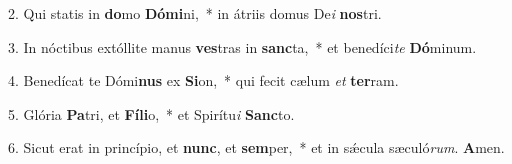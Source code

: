 2. Qui statis in \textbf{do}mo \textbf{Dó}\textbf{mi}ni,~*  in átriis domus De\textit{i} \textbf{nos}tri.\

3. In nóctibus extóllite manus \textbf{ves}tras in \textbf{sanc}ta,~*  et benedíci\textit{te} \textbf{Dó}minum.\

4. Benedícat te Dómi\textbf{nus} ex \textbf{Si}on,~*  qui fecit cælum \textit{et} \textbf{ter}ram.\

5. Glória \textbf{Pa}tri, et \textbf{Fí}\textbf{li}o,~*  et Spirítu\textit{i} \textbf{Sanc}to.\

6. Sicut erat in princípio, et \textbf{nunc}, et \textbf{sem}per,~*  et in sǽcula sæculó\textit{rum}. \textbf{A}men.\

